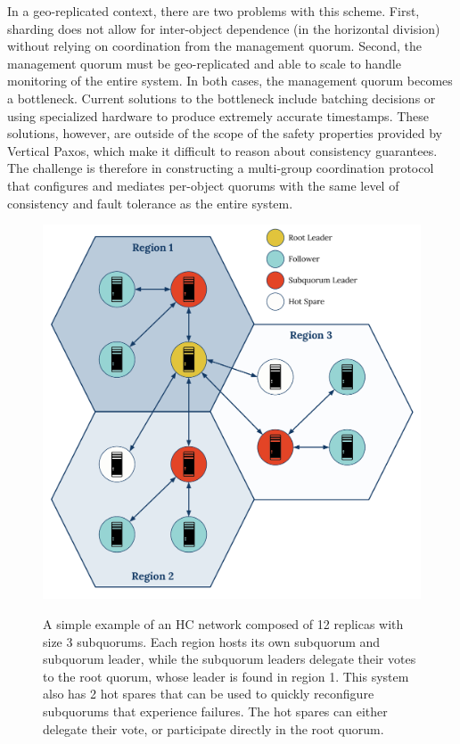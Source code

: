 In a geo-replicated context, there are two problems with this scheme.
First, sharding does not allow for inter-object dependence (in the horizontal division) without relying on coordination from the management quorum.
Second, the management quorum must be geo-replicated and able to scale to handle monitoring of the entire system.
In both cases, the management quorum becomes a bottleneck.
Current solutions to the bottleneck include batching decisions or using specialized hardware to produce extremely accurate timestamps.
These solutions, however, are outside of the scope of the safety properties provided by Vertical Paxos, which make it difficult to reason about consistency guarantees.
The challenge is therefore in constructing a multi-group coordination protocol that configures and mediates per-object quorums with the same level of consistency and fault tolerance as the entire system.

\begin{figure}
    \begin{center}
        \includegraphics[width=5in]{figures/ch03_hierarchical_topology.pdf}
    \end{center}
    \renewcommand{\baselinestretch}{1}
    \small\normalsize

    \begin{quote}
        \caption[A 12x3 Hierarchical Consensus Network Topology]{A simple example of an HC network composed of 12 replicas with size 3 subquorums. Each region hosts its own subquorum and subquorum leader, while the subquorum leaders delegate their votes to the root quorum, whose leader is found in region 1. This system also has 2 hot spares that can be used to quickly reconfigure subquorums that experience failures. The hot spares can either delegate their vote, or participate directly in the root quorum.}
        \label{fig:ch03_hierarchical_topology}
    \end{quote}
\end{figure}
\renewcommand{\baselinestretch}{2}
\small\normalsize

